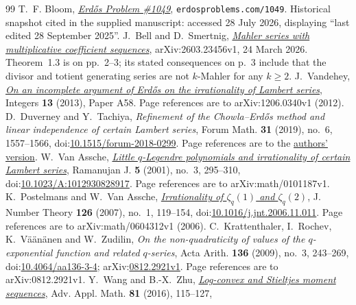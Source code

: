 \documentclass[11pt]{article}
\begin{document}
\begin{thebibliography}{99}
 T.~F. Bloom,
  \href{https://www.erdosproblems.com/1049}{\emph{Erd\H{o}s Problem \#1049}},
  \texttt{erdosproblems.com/1049}. Historical snapshot cited in the supplied
  manuscript: accessed 28 July 2026, displaying ``last edited
  28 September 2025''.
 J.~Bell and D.~Smertnig,
  \href{https://arxiv.org/abs/2603.23456v1}{\emph{Mahler series with
  multiplicative coefficient sequences}}, arXiv:2603.23456v1,
  24 March 2026.  Theorem~1.3 is on pp.~2--3; its stated consequences on
  p.~3 include that the divisor and totient generating series are not
  $k$-Mahler for any $k\ge2$.
 J.~Vandehey,
  \href{https://arxiv.org/abs/1206.0340v1}{\emph{On an incomplete argument of
  Erd\H{o}s on the irrationality of Lambert series}}, Integers
  \textbf{13} (2013), Paper A58. Page references are to
  arXiv:1206.0340v1 (2012).
 D.~Duverney and Y.~Tachiya, \emph{Refinement of
  the Chowla--Erd\H{o}s method and linear independence of certain Lambert
  series}, Forum Math. \textbf{31} (2019), no.~6, 1557--1566,
  doi:\href{https://doi.org/10.1515/forum-2018-0299}{10.1515/forum-2018-0299}.
  Page references are to the
  \href{https://danielduverney.fr/documents/theorie-des-nombres/DuverneyTachiya190522.pdf}{authors'
  version}.
 W.~Van Assche,
  \href{https://arxiv.org/abs/math/0101187v1}{\emph{Little \(q\)-Legendre
  polynomials and irrationality of certain Lambert series}},
  Ramanujan J. \textbf{5} (2001), no.~3, 295--310,
  doi:\href{https://doi.org/10.1023/A:1012930828917}{10.1023/A:1012930828917}.
  Page references are to arXiv:math/0101187v1.
 K.~Postelmans and W.~Van Assche,
  \href{https://arxiv.org/abs/math/0604312v1}{\emph{Irrationality of
  $\zeta_q(1)$ and $\zeta_q(2)$}}, J. Number Theory \textbf{126} (2007),
  no.~1, 119--154,
  doi:\href{https://doi.org/10.1016/j.jnt.2006.11.011}{10.1016/j.jnt.2006.11.011}.
  Page references are to arXiv:math/0604312v1 (2006).
 C.~Krattenthaler, I.~Rochev, K.~V\"a\"an\"anen and
  W.~Zudilin, \emph{On the non-quadraticity of values of the
  \(q\)-exponential function and related \(q\)-series}, Acta Arith.
  \textbf{136} (2009), no.~3, 243--269,
  doi:\href{https://doi.org/10.4064/aa136-3-4}{10.4064/aa136-3-4};
  arXiv:\href{https://arxiv.org/abs/0812.2921v1}{0812.2921v1}.
  Page references are to arXiv:0812.2921v1.
 Y.~Wang and B.-X.~Zhu,
  \href{https://arxiv.org/abs/1612.04114v1}{\emph{Log-convex and Stieltjes
  moment sequences}}, Adv. Appl. Math. \textbf{81} (2016), 115--127,

\end{thebibliography}
\end{document}
